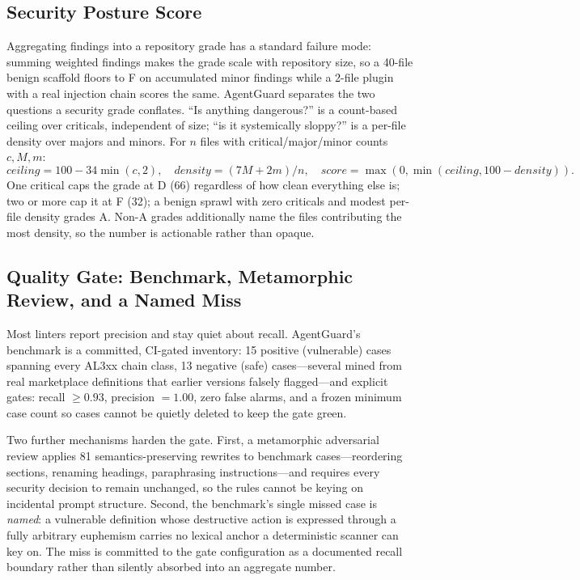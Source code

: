 \documentclass[11pt]{article}
\begin{document}
\subsection{Security Posture Score}
Aggregating findings into a repository grade has a standard failure mode: summing weighted
findings makes the grade scale with repository size, so a 40-file benign scaffold floors to F on
accumulated minor findings while a 2-file plugin with a real injection chain scores the same.
AgentGuard separates the two questions a security grade conflates. ``Is anything dangerous?'' is a
count-based ceiling over criticals, independent of size; ``is it systemically sloppy?'' is a
per-file density over majors and minors. For $n$ files with critical/major/minor counts
$c, M, m$:
\[
  \textit{ceiling} = 100 - 34 \min(c, 2), \quad
  \textit{density} = (7M + 2m)/n, \quad
  \textit{score} = \max(0, \min(\textit{ceiling}, 100 - \textit{density})).
\]
One critical caps the grade at D (66) regardless of how clean everything else is; two or more cap
it at F (32); a benign sprawl with zero criticals and modest per-file density grades A. Non-A
grades additionally name the files contributing the most density, so the number is actionable
rather than opaque.

\subsection{Quality Gate: Benchmark, Metamorphic Review, and a Named Miss}
Most linters report precision and stay quiet about recall. AgentGuard's benchmark is a committed,
CI-gated inventory: 15 positive (vulnerable) cases spanning every AL3xx chain class, 13 negative
(safe) cases---several mined from real marketplace definitions that earlier versions falsely
flagged---and explicit gates: recall $\geq 0.93$, precision $= 1.00$, zero false alarms, and a
frozen minimum case count so cases cannot be quietly deleted to keep the gate green.

Two further mechanisms harden the gate. First, a metamorphic adversarial review applies 81
semantics-preserving rewrites to benchmark cases---reordering sections, renaming headings,
paraphrasing instructions---and requires every security decision to remain unchanged, so the
rules cannot be keying on incidental prompt structure. Second, the benchmark's single missed case
is \emph{named}: a vulnerable definition whose destructive action is expressed through a fully
arbitrary euphemism carries no lexical anchor a deterministic scanner can key on. The miss is
committed to the gate configuration as a documented recall boundary rather than silently absorbed
into an aggregate number.
\end{document}
